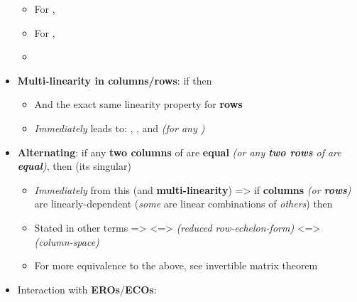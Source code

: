 \begin{itemize}
\begin{itemize}
                  \item
                        For , 
                  \item
                        For , 
                  \item
            \end{itemize}
      \item
            \textbf{Multi-linearity in columns/rows}: if
            then

            \begin{itemize}

                  \item
                        And the exact same linearity property for \textbf{rows}
                  \item
                        \emph{Immediately} leads to: ,
                        , and 
                        \emph{(for any )}
            \end{itemize}
      \item
            \textbf{Alternating}: if any \textbf{two columns} of  are
            \textbf{equal} \emph{(or any \textbf{two rows} of  are
                  \textbf{equal})}, then  (its singular)

            \begin{itemize}

                  \item
                        \emph{Immediately} from this (and \textbf{multi-linearity})
                        => if \textbf{columns} \emph{(or \textbf{rows})} are
                        linearly-dependent (\emph{some} are linear combinations of
                        \emph{others}) then 
                  \item
                        Stated in other terms =>
                         \textless=>
                         \emph{(reduced
                              row-echelon-form)} \textless=>
                        \emph{(column-space)}
                  \item
                        For more equivalence to the above, see invertible matrix theorem
            \end{itemize}
      \item
            Interaction with \textbf{EROs}/\textbf{ECOs}:


\end{itemize}
